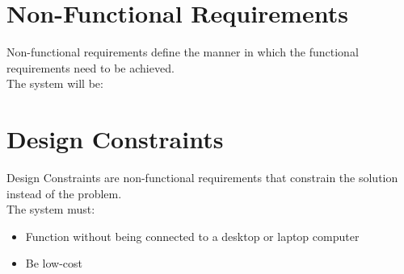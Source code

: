 \section{Non-Functional Requirements}
Non-functional requirements define the manner in which the functional requirements need to be achieved. \\
The system will be:


\section{Design Constraints}
Design Constraints are non-functional requirements that constrain the solution instead of the problem. \\
The system must:
\begin{itemize}
	\item Function without being connected to a desktop or laptop computer
	\item Be low-cost
\end{itemize}

